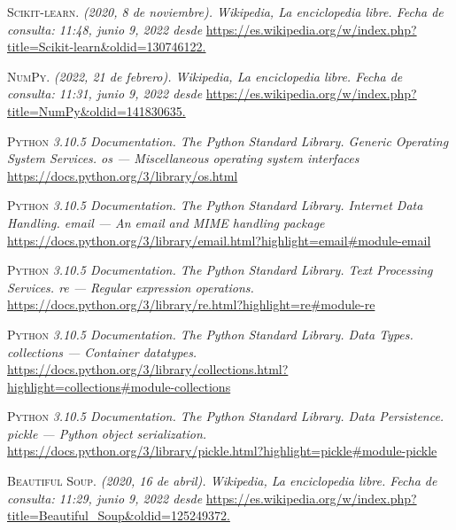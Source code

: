 \documentclass[conference,a4paper]{IEEEtran}
\begin{document}
\begin{thebibliography}{10}
 \textsc{Scikit-learn.} \textit{(2020, 8 de noviembre). Wikipedia, La enciclopedia libre. Fecha de consulta: 11:48, junio 9, 2022 desde} \url{https://es.wikipedia.org/w/index.php?title=Scikit-learn&oldid=130746122.}

 \textsc{NumPy.} \textit{(2022, 21 de febrero). Wikipedia, La enciclopedia libre. Fecha de consulta: 11:31, junio 9, 2022 desde} \url{https://es.wikipedia.org/w/index.php?title=NumPy&oldid=141830635.}


 \textsc{Python} \textit{ 3.10.5 Documentation. The Python Standard Library. Generic Operating System Services. os — Miscellaneous operating system interfaces } \url{https://docs.python.org/3/library/os.html}


 \textsc{Python} \textit{ 3.10.5 Documentation. The Python Standard Library. Internet Data Handling. email — An email and MIME handling package } \url{https://docs.python.org/3/library/email.html?highlight=email#module-email}


 \textsc{Python} \textit{ 3.10.5 Documentation. The Python Standard Library. Text Processing Services. re — Regular expression operations. } \url{https://docs.python.org/3/library/re.html?highlight=re#module-re}

 \textsc{Python} \textit{ 3.10.5 Documentation. The Python Standard Library. Data Types. collections — Container datatypes. } \url{https://docs.python.org/3/library/collections.html?highlight=collections#module-collections}


 \textsc{Python} \textit{ 3.10.5 Documentation. The Python Standard Library. Data Persistence. pickle — Python object serialization. } \url{https://docs.python.org/3/library/pickle.html?highlight=pickle#module-pickle}


 \textsc{Beautiful Soup.} \textit{(2020, 16 de abril). Wikipedia, La enciclopedia libre. Fecha de consulta: 11:29, junio 9, 2022 desde} \url{https://es.wikipedia.org/w/index.php?title=Beautiful_Soup&oldid=125249372.}
 
  
\end{thebibliography}
\end{document}

